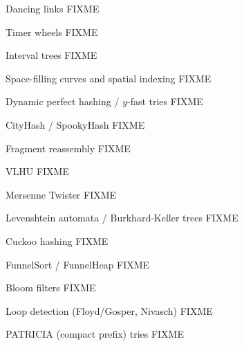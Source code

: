 \documentclass[mathserif,xcolor={dvipsnames,table}]{beamer}
\begin{document}
\begin{frame}{Dancing links}
\huge FIXME
\end{frame}

\begin{frame}{Timer wheels}
\huge FIXME
\end{frame}

\begin{frame}{Interval trees}
\huge FIXME
\end{frame}

\begin{frame}{Space-filling curves and spatial indexing}
\huge FIXME
\end{frame}

\begin{frame}{Dynamic perfect hashing / $y$-fast tries}
\huge FIXME
\end{frame}

\begin{frame}{CityHash / SpookyHash}
\huge FIXME
\end{frame}

\begin{frame}{Fragment reassembly}
\huge FIXME
\end{frame}

\begin{frame}{VLHU}
\huge FIXME
\end{frame}

\begin{frame}{Mersenne Twister}
\huge FIXME
\end{frame}

\begin{frame}{Levenshtein automata / Burkhard-Keller trees}
\huge FIXME
\end{frame}

\begin{frame}{Cuckoo hashing}
\huge FIXME
\end{frame}

\begin{frame}{FunnelSort / FunnelHeap}
\huge FIXME
\end{frame}

\begin{frame}{Bloom filters}
\huge FIXME
\end{frame}

\begin{frame}{Loop detection (Floyd/Gosper, Nivasch)}
\huge FIXME
\end{frame}

\begin{frame}{PATRICIA (compact prefix) tries}
\huge FIXME
\end{frame}
\end{document}
